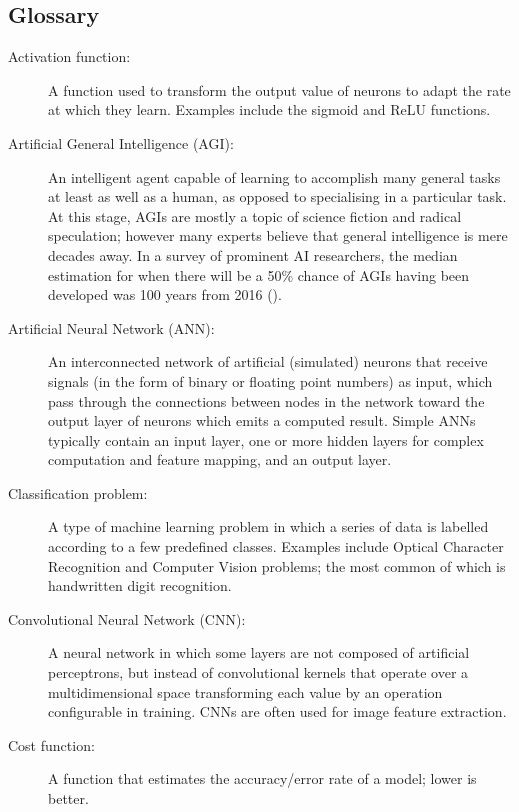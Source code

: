 \documentclass[]{report}
\begin{document}
\twocolumn
\label{sec:Glossary}
\subsection{Glossary}
\begin{description}
\item[Activation function:] A function used to transform the output value of neurons to adapt the rate at which they learn. Examples include the sigmoid and ReLU functions.

\item[Artificial General Intelligence (AGI):] An intelligent agent capable of learning to accomplish many general tasks at least as well as a human, as opposed to specialising in a particular task. At this stage, AGIs are mostly a topic of science fiction and radical speculation; however many experts believe that general intelligence is mere decades away. In a survey of prominent AI researchers, the median estimation for when there will be a 50\% chance of AGIs having been developed was 100 years from 2016 (\cite{grace2017will}).

\item[Artificial Neural Network (ANN):] An interconnected network of artificial (simulated) neurons that receive signals (in the form of binary or floating point numbers) as input, which pass through the connections between nodes in the network toward the output layer of neurons which emits a computed result. Simple ANNs typically contain an input layer, one or more hidden layers for complex computation and feature mapping, and an output layer.

\item[Classification problem:] A type of machine learning problem in which a series of data is labelled according to a few predefined classes. Examples include Optical Character Recognition and Computer Vision problems; the most common of which is handwritten digit recognition.

\item[Convolutional Neural Network (CNN):] A neural network in which some layers are not composed of artificial perceptrons, but instead of convolutional kernels that operate over a multidimensional space transforming each value by an operation configurable in training. CNNs are often used for image feature extraction.

\item[Cost function:] A function that estimates the accuracy/error rate of a model; lower is better.


\end{description}
\end{document}

